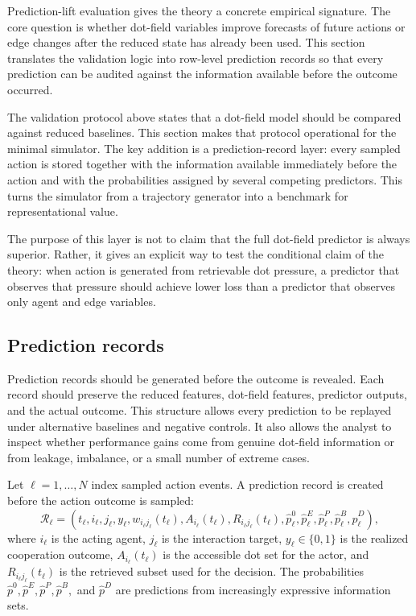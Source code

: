 \documentclass[11pt]{article}
\theoremstyle{remark}
\begin{document}
Prediction-lift evaluation gives the theory a concrete empirical signature. The core question is whether dot-field variables improve forecasts of future actions or edge changes after the reduced state has already been used. This section translates the validation logic into row-level prediction records so that every prediction can be audited against the information available before the outcome occurred.


The validation protocol above states that a dot-field model should be compared
against reduced baselines. This section makes that protocol operational for the
minimal simulator. The key addition is a prediction-record layer: every sampled
action is stored together with the information available immediately before the
action and with the probabilities assigned by several competing predictors.
This turns the simulator from a trajectory generator into a benchmark for
representational value.

The purpose of this layer is not to claim that the full dot-field predictor is
always superior. Rather, it gives an explicit way to test the conditional claim
of the theory: when action is generated from retrievable dot pressure, a
predictor that observes that pressure should achieve lower loss than a predictor
that observes only agent and edge variables.

\subsection{Prediction records}\label{prediction-records}

Prediction records should be generated before the outcome is revealed. Each record should preserve the reduced features, dot-field features, predictor outputs, and the actual outcome. This structure allows every prediction to be replayed under alternative baselines and negative controls. It also allows the analyst to inspect whether performance gains come from genuine dot-field information or from leakage, imbalance, or a small number of extreme cases.


Let $\ell=1,\ldots,N$ index sampled action events. A prediction record is
created before the action outcome is sampled:
\[
\mathcal R_\ell=
(t_\ell,i_\ell,j_\ell,y_\ell,w_{i_\ell j_\ell}(t_\ell),
A_{i_\ell}(t_\ell),R_{i_\ell j_\ell}(t_\ell),\widehat p_\ell^0,
\widehat p_\ell^E,\widehat p_\ell^P,\widehat p_\ell^B,\widehat p_\ell^D),
\]
where $i_\ell$ is the acting agent, $j_\ell$ is the interaction target,
$y_\ell\in\{0,1\}$ is the realized cooperation outcome,
$A_{i_\ell}(t_\ell)$ is the accessible dot set for the actor, and
$R_{i_\ell j_\ell}(t_\ell)$ is the retrieved subset used for the decision.
The probabilities $\widehat p^0,\widehat p^E,\widehat p^P,\widehat p^B,$ and
$\widehat p^D$ are predictions from increasingly expressive information sets.
\end{document}
